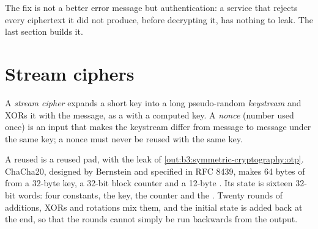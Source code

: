 \label{lst:b3:symmetric-cryptography:oracle}

\label{out:b3:symmetric-cryptography:oracle}

The fix is not a better error message but authentication: a service that rejects every ciphertext it did not produce, before decrypting it, has nothing to leak. The last section builds it.

\section{Stream ciphers}\label{sec:b3:symmetric-cryptography:stream}

\begin{definition}\label{def:b3:symmetric-cryptography:stream}
A \emph{stream cipher} expands a short key into a long pseudo-random \emph{keystream} and XORs it with the message, as a  with a computed key. A \emph{nonce} (number used once) is an input that makes the keystream differ from message to message under the same key; a nonce must never be reused with the same key.
\end{definition}

A reused  is a reused pad, with the leak of \cref{out:b3:symmetric-cryptography:otp}. ChaCha20, designed by Bernstein and specified in RFC 8439, makes 64 bytes of  from a 32-byte key, a 32-bit block counter and a 12-byte . %
Its state is sixteen 32-bit words: four constants, the key, the counter and the . Twenty rounds of additions, XORs and rotations mix them, and the initial state is added back at the end, so that the rounds cannot simply be run backwards from the output.

